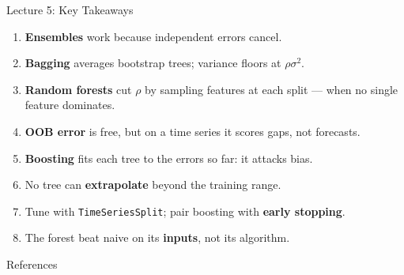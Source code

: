 \documentclass[aspectratio=169, 11pt]{beamer}
\begin{document}
\begin{frame}{Lecture 5: Key Takeaways}
  \begin{keybox}
    {\small
    \begin{enumerate}\itemsep2pt
      \item \textbf{Ensembles} work because independent errors cancel.
      \item \textbf{Bagging} averages bootstrap trees; variance floors at $\rho\sigma^2$.
      \item \textbf{Random forests} cut $\rho$ by sampling features at each split --- when no
            single feature dominates.
      \item \textbf{OOB error} is free, but on a time series it scores gaps, not forecasts.
      \item \textbf{Boosting} fits each tree to the errors so far: it attacks bias.
      \item No tree can \textbf{extrapolate} beyond the training range.
      \item Tune with \texttt{TimeSeriesSplit}; pair boosting with \textbf{early stopping}.
      \item The forest beat naive on its \textbf{inputs}, not its algorithm.
    \end{enumerate}
    }
  \end{keybox}
\end{frame}

\begin{frame}[allowframebreaks]{References}
  \printbibliography[heading=none]
\end{frame}

\end{document}
